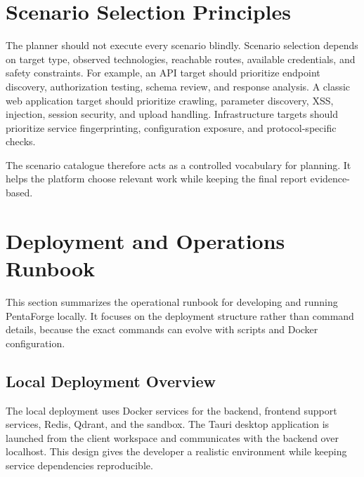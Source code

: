 \documentclass[12pt,a4paper]{report}
\begin{document}
\section*{Scenario Selection Principles}

The planner should not execute every scenario blindly. Scenario selection depends on
target type, observed technologies, reachable routes, available credentials, and safety
constraints. For example, an API target should prioritize endpoint discovery,
authorization testing, schema review, and response analysis. A classic web application
target should prioritize crawling, parameter discovery, XSS, injection, session
security, and upload handling. Infrastructure targets should prioritize service
fingerprinting, configuration exposure, and protocol-specific checks.

The scenario catalogue therefore acts as a controlled vocabulary for planning. It helps
the platform choose relevant work while keeping the final report evidence-based.

\newpage
\section{Deployment and Operations Runbook}

This section summarizes the operational runbook for developing and running PentaForge
locally. It focuses on the deployment structure rather than command details, because
the exact commands can evolve with scripts and Docker configuration.

\subsection*{Local Deployment Overview}

The local deployment uses Docker services for the backend, frontend support services,
Redis, Qdrant, and the sandbox. The Tauri desktop application is launched from the
client workspace and communicates with the backend over localhost. This design gives
the developer a realistic environment while keeping service dependencies reproducible.
\end{document}
